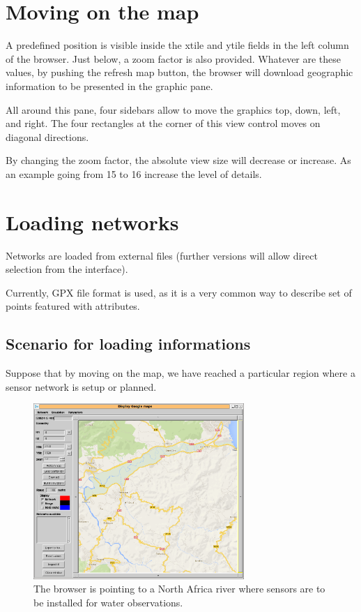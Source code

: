 \section{Moving on the map}
A predefined position is visible inside the xtile and ytile fields 
in the left column of the browser. Just below, a zoom factor is also provided. 
Whatever are these values, by pushing the refresh map button, the browser 
will download geographic information to be presented in the graphic pane. 

All around this pane, four sidebars allow to move the graphics top, down, left, and right. 
The four rectangles at the corner of this view control moves on diagonal directions. 

By changing the zoom factor, the absolute view size will decrease or increase. 
As an example going from 15 to 16 increase the level of details. 

\section{Loading networks}
Networks are loaded from external files (further versions will allow direct 
selection from the interface). 

Currently, GPX file format is used, as it is a very common way to describe set of 
points featured with attributes. 

\subsection{Scenario for loading informations}
Suppose that by moving on the map, we have reached a particular region 
where a sensor network is setup or planned.

\begin{figure}
\begin{center}
\includegraphics[width=8cm]{soummam0.png}
\caption{The browser is pointing to a North Africa river where sensors are to be installed
for water observations.}
\label{fig:initialSoummam}
\end{center}
\end{figure}


